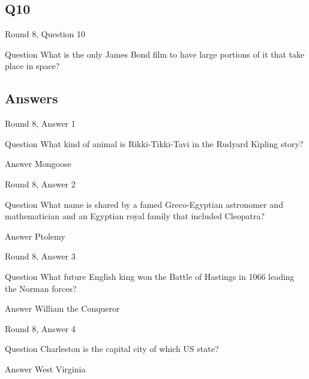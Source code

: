 \documentclass[11pt]{beamer}
\begin{document}
\subsection*{Q10}
\begin{frame}[t]{Round 8, Question 10}
\vspace{2em}
\begin{block}{Question}
What is the only James Bond film to have large portions of it that take place in space\@?
\end{block}
\end{frame}
    
\subsection{Answers}

\begin{frame}[t]{Round 8, Answer 1}
\vspace{2em}
\begin{block}{Question}
What kind of animal is Rikki-Tikki-Tavi in the Rudyard Kipling story\@?
\end{block}
\pause{}
\begin{block}{Answer}
Mongoose
\end{block}
\end{frame}
    

\begin{frame}[t]{Round 8, Answer 2}
\vspace{2em}
\begin{block}{Question}
What name is shared by a famed Greco-Egyptian astronomer and mathematician and an Egyptian royal family that included Cleopatra\@?
\end{block}
\pause{}
\begin{block}{Answer}
Ptolemy
\end{block}
\end{frame}
    

\begin{frame}[t]{Round 8, Answer 3}
\vspace{2em}
\begin{block}{Question}
What future English king won the Battle of Hastings in 1066 leading the Norman forces\@?
\end{block}
\pause{}
\begin{block}{Answer}
William the Conqueror
\end{block}
\end{frame}
    

\begin{frame}[t]{Round 8, Answer 4}
\vspace{2em}
\begin{block}{Question}
Charleston is the capital city of which US state\@?
\end{block}
\pause{}
\begin{block}{Answer}
West Virginia
\end{block}
\end{frame}
    
\end{document}
